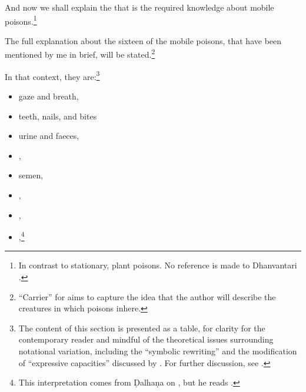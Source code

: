 \begin{translation}
  
  \item[1] 
  
And now we shall explain the  that is the
required knowledge about mobile poisons.\footnote{In contrast to
    stationary, plant poisons.  No reference is made to Dhanvantari
    \citep[see][]{birc-2021}.}

  \item[3] 
  
The full explanation about the sixteen  of
the mobile poisons, that have been mentioned by me in brief, will be
stated.\footnote{“Carrier” for  aims
    to capture the idea that the author will describe the creatures in
    which poisons inhere.}
  
\item[4] 

In that context, they are:\footnote{The content of this section is
    presented as a table, for clarity for the contemporary reader and
    mindful of the theoretical issues surrounding notational variation,
    including the “symbolic rewriting” and the modification of “expressive
    capacities” discussed by \citet[321\,ff]{saru-2016}.  For further
    discussion, see \cite[81--83]{wuja-2021}.}
  \begin{multicols}{2}
      
  \begin{itemize} 
      
      \item gaze and breath, 
      
      \item teeth, nails, and bites 
      
      \item urine and faeces,

\item {}, 

\item semen,

\item {},
  
 
 \item {}, \item
{},\footnote{This interpretation  comes from
    Ḍalhaṇa on , but he reads .}
 

\end{itemize}
\end{multicols}
\end{translation}

